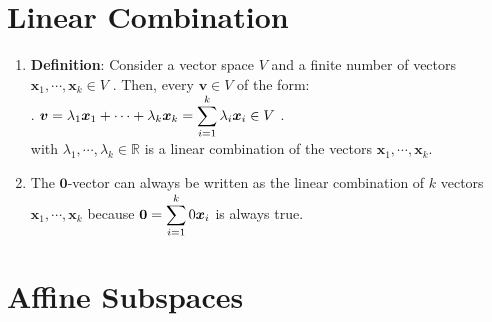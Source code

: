 \section{Linear Combination}

\begin{enumerate}
    \item \textbf{Definition}: Consider a vector space $V$ and a finite number of vectors $\bm{x}_1, \cdots , \bm{x}_k \in V$ . 
    Then, every $\bm{v} \in V$ of the form:
    \\
    .\hfill
    $
        \bm{v} 
        = \lambda _1 \bm{x}_1 + \cdots + \lambda _k \bm{x}_k
        = \displaystyle\sum_{i=1}^k \lambda _i \bm{x}_i
        \in V
    $
    \hfill.
    \\
    with $\lambda _1, \cdots , \lambda _k \in \mathbb{R}$ is a linear combination of the vectors $\bm{x}_1, \cdots , \bm{x}_k$.
    \hfill \cite{mfml/book/mml/Deisenroth-Faisal-Ong}

    \item The $\bm{0}$-vector can always be written as the linear combination of $k$ vectors $\bm{x}_1, \cdots , \bm{x}_k$ because $\bm{0} = \displaystyle\sum ^k _{i=1} 0 \bm{x}_i$ is always true.
    \hfill \cite{mfml/book/mml/Deisenroth-Faisal-Ong}

    
\end{enumerate}







\section{Affine Subspaces}


